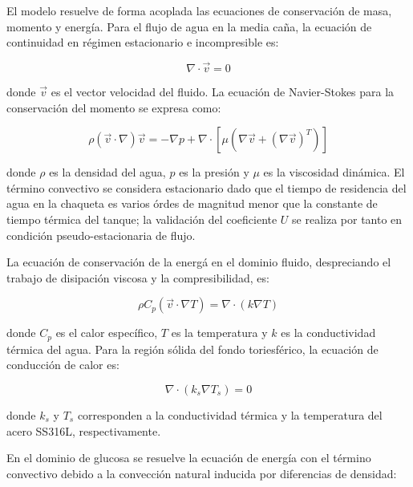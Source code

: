 El modelo resuelve de forma acoplada las ecuaciones de conservaci\'on de masa, momento y energ\'ia. Para el flujo de agua en la media ca\~na, la ecuaci\'on de continuidad en r\'egimen estacionario e incompresible es:

\begin{equation}
\nabla \cdot \vec{v} = 0
\label{eq:continuidad_cfd}
\end{equation}

donde $\vec{v}$ es el vector velocidad del fluido. La ecuaci\'on de Navier-Stokes para la conservaci\'on del momento se expresa como:

\begin{equation}
\rho \left( \vec{v} \cdot \nabla \right) \vec{v} = -\nabla p + \nabla \cdot \left[ \mu \left( \nabla \vec{v} + (\nabla \vec{v})^T \right) \right]
\label{eq:navier_stokes_cfd}
\end{equation}

donde $\rho$ es la densidad del agua, $p$ es la presi\'on y $\mu$ es la viscosidad din\'amica. El t\'ermino convectivo se considera estacionario dado que el tiempo de residencia del agua en la chaqueta es varios \'ordes de magnitud menor que la constante de tiempo t\'ermica del tanque; la validaci\'on del coeficiente $U$ se realiza por tanto en condici\'on pseudo-estacionaria de flujo.

La ecuaci\'on de conservaci\'on de la energ\'a en el dominio fluido, despreciando el trabajo de disipaci\'on viscosa y la compresibilidad, es:

\begin{equation}
\rho C_p \left( \vec{v} \cdot \nabla T \right) = \nabla \cdot (k \nabla T)
\label{eq:energia_fluido_cfd}
\end{equation}

donde $C_p$ es el calor espec\'ifico, $T$ es la temperatura y $k$ es la conductividad t\'ermica del agua. Para la regi\'on s\'olida del fondo toriesf\'erico, la ecuaci\'on de conducci\'on de calor es:

\begin{equation}
\nabla \cdot (k_s \nabla T_s) = 0
\label{eq:conduccion_solido_cfd}
\end{equation}

donde $k_s$ y $T_s$ corresponden a la conductividad t\'ermica y la temperatura del acero SS316L, respectivamente.

En el dominio de glucosa se resuelve la ecuaci\'on de energ\'ia con el t\'ermino convectivo debido a la convecci\'on natural inducida por diferencias de densidad:

